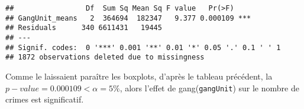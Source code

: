 \documentclass[
]{book}
\begin{document}
\begin{verbatim}
##                 Df  Sum Sq Mean Sq F value   Pr(>F)    
## GangUnit_means   2  364694  182347   9.377 0.000109 ***
## Residuals      340 6611431   19445                     
## ---
## Signif. codes:  0 '***' 0.001 '**' 0.01 '*' 0.05 '.' 0.1 ' ' 1
## 1872 observations deleted due to missingness
\end{verbatim}

Comme le laissaient paraître les boxplots, d'après le tableau précédent, la \(p-value=0.000109<\alpha=5\%\), alors l'effet de gang(\texttt{gangUnit}) sur le nombre de crimes est significatif.

  
\end{document}
